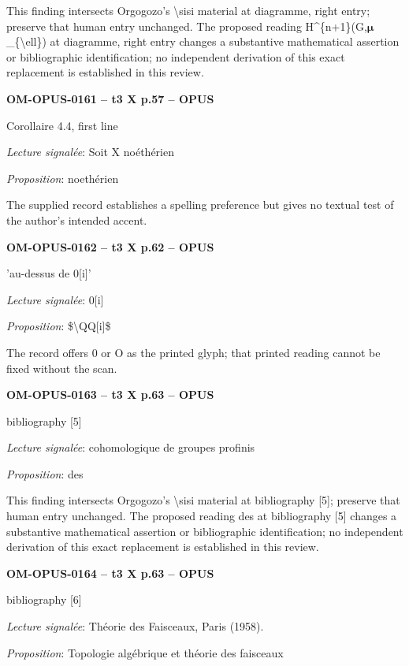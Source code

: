 This finding intersects Orgogozo's \textbackslash{}sisi material at diagramme, right entry; preserve that human entry unchanged. The proposed reading H\textasciicircum{}\{n+1\}(G,\ensuremath{𝛍}\_\{\textbackslash{}ell\}) at diagramme, right entry changes a substantive mathematical assertion or bibliographic identification; no independent derivation of this exact replacement is established in this review.\par
\par\noindent\textbf{OM-OPUS-0161 -- t3 X p.57 -- OPUS}\par
Corollaire 4.4, first line\par
\emph{Lecture signalée}: Soit X noéthérien\par
\emph{Proposition}: noethérien\par
The supplied record establishes a spelling preference but gives no textual test of the author's intended accent.\par
\par\noindent\textbf{OM-OPUS-0162 -- t3 X p.62 -- OPUS}\par
'au-dessus de 0[i]'\par
\emph{Lecture signalée}: 0[i]\par
\emph{Proposition}: \$\textbackslash{}QQ[i]\$\par
The record offers 0 or O as the printed glyph; that printed reading cannot be fixed without the scan.\par
\par\noindent\textbf{OM-OPUS-0163 -- t3 X p.63 -- OPUS}\par
bibliography [5]\par
\emph{Lecture signalée}: cohomologique de groupes profinis\par
\emph{Proposition}: des\par
This finding intersects Orgogozo's \textbackslash{}sisi material at bibliography [5]; preserve that human entry unchanged. The proposed reading des at bibliography [5] changes a substantive mathematical assertion or bibliographic identification; no independent derivation of this exact replacement is established in this review.\par
\par\noindent\textbf{OM-OPUS-0164 -- t3 X p.63 -- OPUS}\par
bibliography [6]\par
\emph{Lecture signalée}: Théorie des Faisceaux, Paris (1958).\par
\emph{Proposition}: Topologie algébrique et théorie des faisceaux\par
